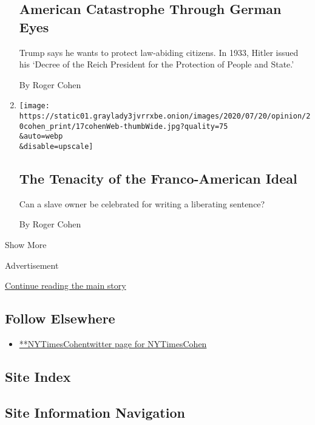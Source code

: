 \begin{enumerate}
{  \subsection{American Catastrophe Through German
  Eyes}\label{american-catastrophe-through-german-eyes}}

  Trump says he wants to protect law-abiding citizens. In 1933, Hitler
  issued his `Decree of the Reich President for the Protection of People
  and State.'

  By Roger Cohen
\item
  \href{/2020/07/17/opinion/france-america-thomas-jefferson-race.html}{}

  \texttt{[image: https://static01.graylady3jvrrxbe.onion/images/2020/07/20/opinion/20cohen\_print/17cohenWeb-thumbWide.jpg?quality=75\\\&auto=webp\\\&disable=upscale]}

  \hypertarget{the-tenacity-of-the-franco-american-ideal}{%
  \subsection{The Tenacity of the Franco-American
  Ideal}\label{the-tenacity-of-the-franco-american-ideal}}

  Can a slave owner be celebrated for writing a liberating sentence?

  By Roger Cohen
\end{enumerate}

Show More

Advertisement

\protect\hyperlink{after-mid2}{Continue reading the main story}

\hypertarget{follow-elsewhere}{%
\subsection{Follow Elsewhere}\label{follow-elsewhere}}

\begin{itemize}
\tightlist
\item
  \href{https://twitter.com/NYTimesCohen}{**NYTimesCohentwitter page for
  NYTimesCohen}
\end{itemize}

\hypertarget{site-index}{%
\subsection{Site Index}\label{site-index}}

\hypertarget{site-information-navigation}{%
\subsection{Site Information
Navigation}\label{site-information-navigation}}

